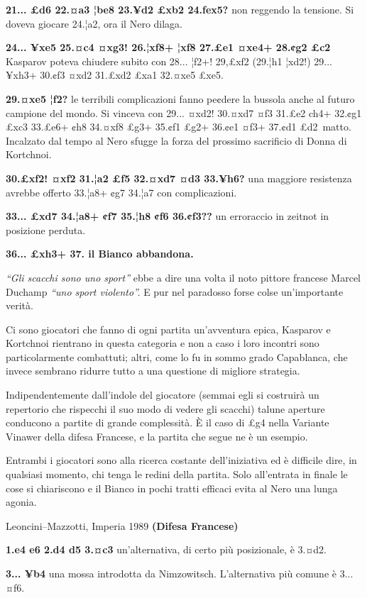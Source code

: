 \documentclass[
]{article}
\begin{document}
\textbf{21... £d6 22.¤a3 ¦be8 23.¥d2 £xb2 24.fex5?} non reggendo la
tensione. Si doveva giocare 24.¦a2, ora il Nero dilaga.

\textbf{24... ¥xe5 25.¤c4 ¤xg3! 26.¦xf8+ ¦xf8 27.£e1 ¤xe4+ 28.¢g2 £c2}
Kasparov poteva chiudere subito con 28... ¦f2+! 29,£xf2 (29.¦h1 ¦xd2!)
29... ¥xh3+ 30.¢f3 ¤xd2 31.£xd2 £xa1 32.¤xe5 £xe5.

\textbf{29.¤xe5 ¦f2?} le terribili complicazioni fanno pe¢dere la
bussola anche al futuro campione del mondo. Si vinceva con 29... ¤xd2!
30.¤xd7 ¤f3 31.£e2 ch4+ 32.¢g1 £xc3 33.£e6+ ¢h8 34.¤xf8 £g3+ 35.¢f1 £g2+
36.¢e1 ¤f3+ 37.¢d1 £d2~matto. Incalzato dal tempo al Nero sfugge la
forza del prossimo sacrificio di Donna di Kortchnoi.

\textbf{30.£xf2! ¤xf2 31.¦a2 £f5 32.¤xd7 ¤d3 33.¥h6?} una maggiore
resistenza avrebbe offerto 33.¦a8+ ¢g7 34.¦a7 con complicazioni.

\textbf{33... £xd7 34.¦a8+ ¢f7 35.¦h8 ¢f6 36.¢f3??} un erroraccio in
zeitnot in posizione perduta.

\textbf{36... £xh3+ 37. il Bianco abbandona.}

\emph{``Gli scacchi sono uno sport''} ebbe a dire una volta il noto
pittore francese Marcel Duchamp \emph{``uno sport violento''.} E pur nel
paradosso forse colse un'importante verità.

Ci sono giocatori che fanno di ogni partita un'avventura epica, Kasparov
e Kortchnoi rientrano in questa categoria e non a caso i loro incontri
sono particolarmente combattuti; altri, come lo fu in sommo grado
Capablanca, che invece sembrano ridurre tutto a una questione di
migliore strategia.

Indipendentemente dall'indole del giocatore (semmai egli si costruirà un
repertorio che rispecchi il suo modo di vedere gli scacchi) talune
aperture conducono a partite di grande complessità. È il caso di £g4
nella Variante Vinawer della difesa Francese, e la partita che segue ne
è un esempio.

Entrambi i giocatori sono alla ricerca costante dell'iniziativa ed è
difficile dire, in qualsiasi momento, chi tenga le redini della partita.
Solo all'entrata in finale le cose si chiariscono e il Bianco in pochi
tratti efficaci evita al Nero una lunga agonia.

Leoncini--Mazzotti, Imperia 1989 \textbf{(Difesa Francese)}

\textbf{1.e4 e6 2.d4 d5 3.¤c3} un'alternativa, di certo più posizionale,
è 3.¤d2.

\textbf{3... ¥b4} una mossa introdotta da Nimzowitsch. L'alternativa più
comune è 3... ¤f6.
\end{document}
